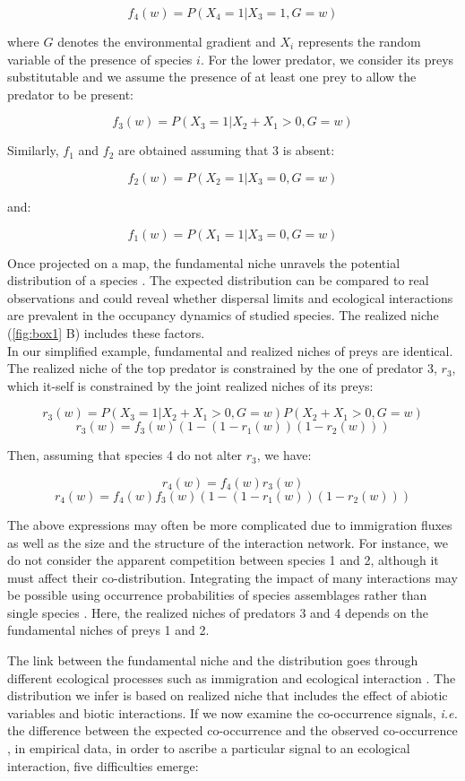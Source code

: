 \[f_4(w)=P(X_4=1|X_3=1, G=w)\]

where \(G\) denotes the environmental gradient and \(X_i\) represents
the random variable of the presence of species \(i\). For the lower
predator, we consider its preys substitutable and we assume the presence
of at least one prey to allow the predator to be present:

\[f_3(w)=P(X_3=1|X_2+X_1>0, G=w)\]

Similarly, \(f_1\) and \(f_2\) are obtained assuming that 3 is absent:

\[f_2(w)=P(X_2=1|X_3=0, G=w)\]

and:

\[f_1(w)=P(X_1=1|X_3=0, G=w)\]

Once projected on a map, the fundamental niche unravels the potential
distribution of a species \citep{Kearney2004}. The expected distribution
can be compared to real observations and could reveal whether dispersal
limits and ecological interactions are prevalent in the occupancy
dynamics of studied species. The realized niche (\ref{fig:box1} B)
includes these factors.\\
In our simplified example, fundamental and realized niches of preys are
identical. The realized niche of the top predator is constrained by the
one of predator 3, \(r_3\), which it-self is constrained by the joint
realized niches of its preys:

\[r_3(w)=P(X_3=1|X_2+X_1>0, G=w)P(X_2+X_1>0, G=w)\]
\[r_3(w)=f_3(w)\left(1-(1-r_1(w))(1-r_2(w))\right)\]

Then, assuming that species 4 do not alter \(r_3\), we have:

\[r_4(w)=f_4(w)r_3(w)\]
\[r_4(w)=f_4(w)f_3(w)\left(1-(1-r_1(w))(1-r_2(w))\right)\]

The above expressions may often be more complicated due to immigration
fluxes as well as the size and the structure of the interaction network.
For instance, we do not consider the apparent competition between
species 1 and 2, although it must affect their co-distribution.
Integrating the impact of many interactions may be possible using
occurrence probabilities of species assemblages rather than single
species \citep{Cazelles2016}. Here, the realized niches of predators 3
and 4 depends on the fundamental niches of preys 1 and 2.

The link between the fundamental niche and the distribution goes through
different ecological processes such as immigration and ecological
interaction \citep{Pulliam2000, Godsoe2010a}. The distribution we infer
is based on realized niche that includes the effect of abiotic variables
and biotic interactions. If we now examine the co-occurrence signals,
\emph{i.e.} the difference between the expected co-occurrence and the
observed co-occurrence \citep{Cazelles2016}, in empirical data, in order
to ascribe a particular signal to an ecological interaction, five
difficulties emerge:

